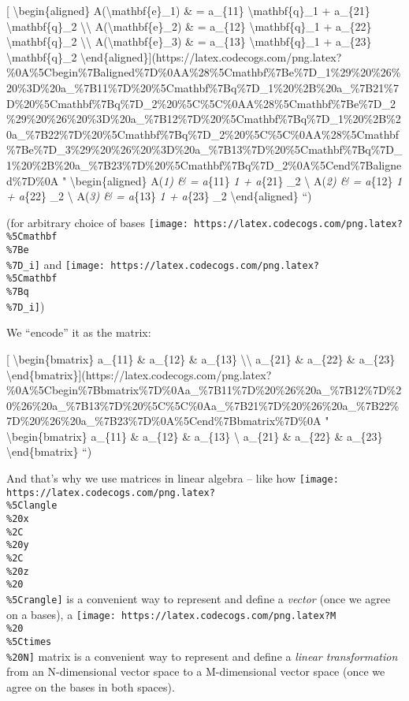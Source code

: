 \documentclass[]{article}
\begin{document}
{[} \textbackslash{}begin\{aligned\} A(\textbackslash{}mathbf\{e\}\_1) \& =
a\_\{11\} \textbackslash{}mathbf\{q\}\_1 + a\_\{21\}
\textbackslash{}mathbf\{q\}\_2 \textbackslash{}\textbackslash{}
A(\textbackslash{}mathbf\{e\}\_2) \& = a\_\{12\} \textbackslash{}mathbf\{q\}\_1
+ a\_\{22\} \textbackslash{}mathbf\{q\}\_2 \textbackslash{}\textbackslash{}
A(\textbackslash{}mathbf\{e\}\_3) \& = a\_\{13\} \textbackslash{}mathbf\{q\}\_1
+ a\_\{23\} \textbackslash{}mathbf\{q\}\_2
\textbackslash{}end\{aligned\}{]}(https://latex.codecogs.com/png.latex?\%0A\%5Cbegin\%7Baligned\%7D\%0AA\%28\%5Cmathbf\%7Be\%7D\_1\%29\%20\%26\%20\%3D\%20a\_\%7B11\%7D\%20\%5Cmathbf\%7Bq\%7D\_1\%20\%2B\%20a\_\%7B21\%7D\%20\%5Cmathbf\%7Bq\%7D\_2\%20\%5C\%5C\%0AA\%28\%5Cmathbf\%7Be\%7D\_2\%29\%20\%26\%20\%3D\%20a\_\%7B12\%7D\%20\%5Cmathbf\%7Bq\%7D\_1\%20\%2B\%20a\_\%7B22\%7D\%20\%5Cmathbf\%7Bq\%7D\_2\%20\%5C\%5C\%0AA\%28\%5Cmathbf\%7Be\%7D\_3\%29\%20\%26\%20\%3D\%20a\_\%7B13\%7D\%20\%5Cmathbf\%7Bq\%7D\_1\%20\%2B\%20a\_\%7B23\%7D\%20\%5Cmathbf\%7Bq\%7D\_2\%0A\%5Cend\%7Baligned\%7D\%0A
" \textbackslash{}begin\{aligned\} A(\emph{1) \& = a}\{11\}
\emph{1 + a}\{21\} \_2 \textbackslash{} A(\emph{2)
\& = a}\{12\} \emph{1 + a}\{22\} \_2 \textbackslash{}
A(\emph{3) \& = a}\{13\} \emph{1 + a}\{23\} \_2
\textbackslash{}end\{aligned\} ``)

(for arbitrary choice of bases
\texttt{[image: https://latex.codecogs.com/png.latex?\\\%5Cmathbf\\\%7Be\\\%7D\_i]} and
\texttt{[image: https://latex.codecogs.com/png.latex?\\\%5Cmathbf\\\%7Bq\\\%7D\_i]})

We ``encode'' it as the matrix:

{[} \textbackslash{}begin\{bmatrix\} a\_\{11\} \& a\_\{12\} \& a\_\{13\}
\textbackslash{}\textbackslash{} a\_\{21\} \& a\_\{22\} \& a\_\{23\}
\textbackslash{}end\{bmatrix\}{]}(https://latex.codecogs.com/png.latex?\%0A\%5Cbegin\%7Bbmatrix\%7D\%0Aa\_\%7B11\%7D\%20\%26\%20a\_\%7B12\%7D\%20\%26\%20a\_\%7B13\%7D\%20\%5C\%5C\%0Aa\_\%7B21\%7D\%20\%26\%20a\_\%7B22\%7D\%20\%26\%20a\_\%7B23\%7D\%0A\%5Cend\%7Bbmatrix\%7D\%0A
" \textbackslash{}begin\{bmatrix\} a\_\{11\} \& a\_\{12\} \& a\_\{13\}
\textbackslash{} a\_\{21\} \& a\_\{22\} \& a\_\{23\}
\textbackslash{}end\{bmatrix\} ``)

And that's why we use matrices in linear algebra -- like how
\texttt{[image: https://latex.codecogs.com/png.latex?\\\%5Clangle\\\%20x\\\%2C\\\%20y\\\%2C\\\%20z\\\%20\\\%5Crangle]}
is a convenient way to represent and define a \emph{vector} (once we agree on a
bases), a
\texttt{[image: https://latex.codecogs.com/png.latex?M\\\%20\\\%5Ctimes\\\%20N]}
matrix is a convenient way to represent and define a \emph{linear
transformation} from an N-dimensional vector space to a M-dimensional vector
space (once we agree on the bases in both spaces).
\end{document}
